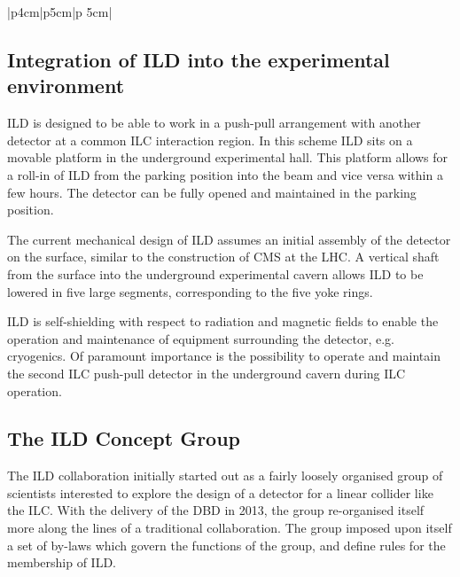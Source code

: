 \begin{table}[thb!]
\begin{tabular}{|p{4cm}|p{5cm}|p {5cm}|}


    \end{tabular}
    \caption{table of benchmark reactions which are used by ILD to optimize the detector performance. The analyses are mostly conducted at 500\,GeV center-of-mass energy, to optimally study the detector sensitivty. The channel, the physics motivation, and the main detector performance parameters are given.}
    \label{tab-benchmark}
\end{table}

\subsection{Integration of ILD into the experimental environment}
ILD is designed to be able to work in a push-pull arrangement with another detector at a common ILC interaction region. In this scheme ILD sits on a movable platform in the underground experimental hall. This platform allows for a roll-in of ILD from the parking position into the beam and vice versa within a few hours. The detector can be fully opened and maintained in the parking position.

The current mechanical design of ILD assumes an initial assembly of the detector on the surface, similar to the construction of CMS at the LHC. A vertical shaft from the surface into the underground experimental cavern allows ILD to be lowered in five large segments, corresponding to the five yoke rings.

ILD is self-shielding with respect to radiation and magnetic fields to enable the operation and maintenance of equipment surrounding the detector, {e.g.} cryogenics. Of paramount importance is the possibility to operate and maintain the second ILC push-pull detector in the underground cavern during ILC operation.

\subsection{The ILD Concept Group}
The ILD collaboration initially started out as a fairly loosely organised group of scientists interested to explore the design of a detector for a linear collider like the ILC. With the delivery of the DBD in 2013, the group re-organised itself more along the lines of a traditional collaboration. The group imposed upon itself a set of by-laws which govern the functions of the group, and define rules for the membership of ILD. 

